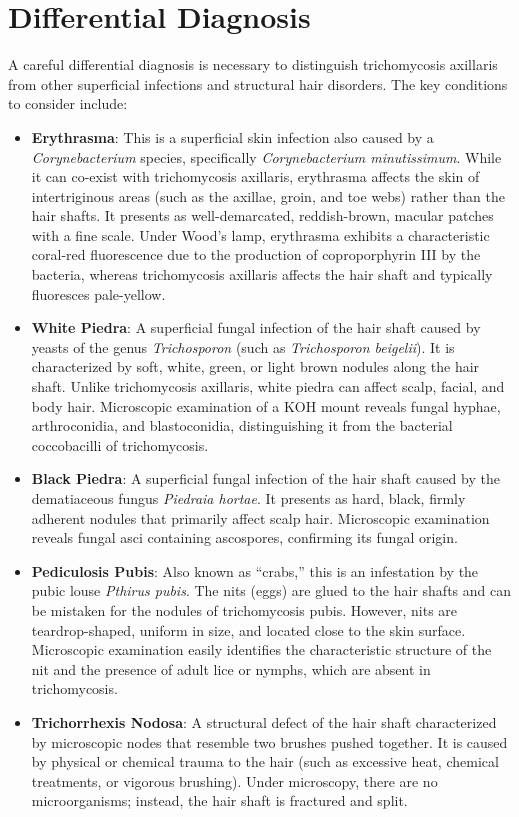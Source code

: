 \section*{Differential Diagnosis}
A careful differential diagnosis is necessary to distinguish trichomycosis axillaris from other superficial infections and structural hair disorders. The key conditions to consider include:
\begin{itemize}
    \item \textbf{Erythrasma}: This is a superficial skin infection also caused by a \textit{Corynebacterium} species, specifically \textit{Corynebacterium minutissimum}. While it can co-exist with trichomycosis axillaris, erythrasma affects the skin of intertriginous areas (such as the axillae, groin, and toe webs) rather than the hair shafts. It presents as well-demarcated, reddish-brown, macular patches with a fine scale. Under Wood's lamp, erythrasma exhibits a characteristic coral-red fluorescence due to the production of coproporphyrin III by the bacteria, whereas trichomycosis axillaris affects the hair shaft and typically fluoresces pale-yellow.
    \item \textbf{White Piedra}: A superficial fungal infection of the hair shaft caused by yeasts of the genus \textit{Trichosporon} (such as \textit{Trichosporon beigelii}). It is characterized by soft, white, green, or light brown nodules along the hair shaft. Unlike trichomycosis axillaris, white piedra can affect scalp, facial, and body hair. Microscopic examination of a KOH mount reveals fungal hyphae, arthroconidia, and blastoconidia, distinguishing it from the bacterial coccobacilli of trichomycosis.
    \item \textbf{Black Piedra}: A superficial fungal infection of the hair shaft caused by the dematiaceous fungus \textit{Piedraia hortae}. It presents as hard, black, firmly adherent nodules that primarily affect scalp hair. Microscopic examination reveals fungal asci containing ascospores, confirming its fungal origin.
    \item \textbf{Pediculosis Pubis}: Also known as ``crabs,'' this is an infestation by the pubic louse \textit{Pthirus pubis}. The nits (eggs) are glued to the hair shafts and can be mistaken for the nodules of trichomycosis pubis. However, nits are teardrop-shaped, uniform in size, and located close to the skin surface. Microscopic examination easily identifies the characteristic structure of the nit and the presence of adult lice or nymphs, which are absent in trichomycosis.
    \item \textbf{Trichorrhexis Nodosa}: A structural defect of the hair shaft characterized by microscopic nodes that resemble two brushes pushed together. It is caused by physical or chemical trauma to the hair (such as excessive heat, chemical treatments, or vigorous brushing). Under microscopy, there are no microorganisms; instead, the hair shaft is fractured and split.

\end{itemize}
